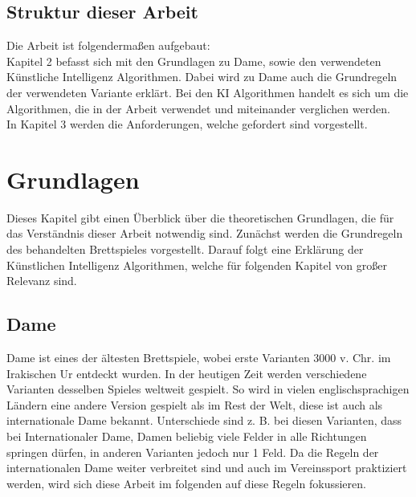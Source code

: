 \documentclass[12pt,a4paper,bibliography=totocnumbered,listof=totocnumbered]{article}
\begin{document}
\subsection{Struktur dieser Arbeit}
Die Arbeit ist folgendermaßen aufgebaut: \\
Kapitel 2 befasst sich mit den Grundlagen zu Dame, sowie den verwendeten 
Künstliche Intelligenz Algorithmen. Dabei wird zu Dame auch die Grundregeln der
verwendeten Variante erklärt. Bei den KI Algorithmen handelt es sich um die Algorithmen, die in 
der Arbeit verwendet und miteinander verglichen werden. \\
In Kapitel 3 werden die Anforderungen, welche gefordert sind vorgestellt.

\section{Grundlagen}
Dieses Kapitel gibt einen Überblick über die theoretischen Grundlagen, die für das Verständnis 
dieser Arbeit notwendig sind. Zunächst werden die Grundregeln des behandelten Brettspieles 
vorgestellt. Darauf folgt eine Erklärung der Künstlichen Intelligenz Algorithmen, welche für 
folgenden Kapitel von großer Relevanz sind.


\subsection{Dame}
Dame ist eines der ältesten Brettspiele, wobei erste Varianten 3000 v. Chr. im Irakischen Ur
entdeckt wurden. In der heutigen Zeit werden verschiedene Varianten desselben Spieles weltweit
gespielt. So wird in vielen englischsprachigen Ländern eine andere Version gespielt als im Rest
der Welt, diese ist auch als internationale Dame bekannt. Unterschiede sind z. B. bei diesen Varianten,
dass bei Internationaler Dame, Damen beliebig viele Felder in alle Richtungen springen dürfen, 
in anderen Varianten jedoch nur 1 Feld. Da die Regeln der internationalen Dame
weiter verbreitet sind und auch im Vereinssport praktiziert werden, wird sich diese Arbeit im folgenden
auf diese Regeln fokussieren.
\end{document}
